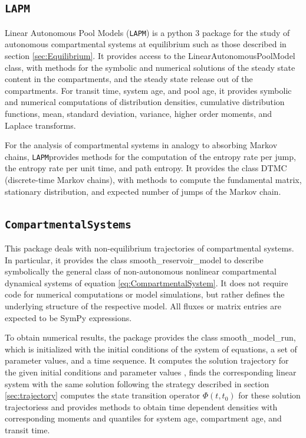 \documentclass[a4paper]{article}
\newcommand{\LAPM}{\texttt{LAPM}}
\newcommand{\CompartmentalSystems}{\texttt{CompartmentalSystems}}
\begin{document}
\subsection{\LAPM}
Linear Autonomous Pool Models (\LAPM) is a python 3 package for the study of autonomous compartmental systems at equilibrium such as those described in section \ref{sec:Equilibrium}. 
It provides access to the LinearAutonomousPoolModel class, with methods for the
symbolic and numerical solutions of the steady state content in the compartments, and the steady state release out of the compartments. For transit time, system age, and pool age, it provides symbolic and numerical computations of distribution densities, cumulative distribution functions, mean, standard deviation,           variance, higher order moments, and Laplace transforms. 

For the analysis of compartmental systems in analogy to absorbing Markov chains, \LAPM provides methods for the computation of the entropy rate per jump, the entropy rate per unit time, and path entropy. It provides the class DTMC (discrete-time Markov chains), with methods to compute the fundamental matrix, stationary distribution, and expected number of jumps of the Markov chain.

\subsection{\CompartmentalSystems}
This package deals with non-equilibrium trajectories of compartmental systems.
In particular, it provides the class smooth\_reservoir\_model to describe
symbolically the general class of non-autonomous nonlinear compartmental
dynamical systems of equation \eqref{eq:CompartmentalSystem}. It does not
require code for numerical computations or model simulations, but rather defines the underlying structure of the respective model. 
All fluxes or matrix entries are expected to be SymPy expressions. 

To obtain numerical results, the package
provides the class smooth\_model\_run, which is initialized with the initial
conditions of the system of equations, a set of parameter values, and a time
sequence. It computes the solution trajectory for the given initial conditions and
parameter values , finds the corresponding linear system with the same solution
following the strategy described in section \ref{sec:trajectory} computes the
state transition operator $\Phi(t, t_0)$ for these solution trajectoriess and 
provides methods to obtain time dependent densities with corresponding moments and quantiles for system age, compartment age, and transit time. 
\end{document}
